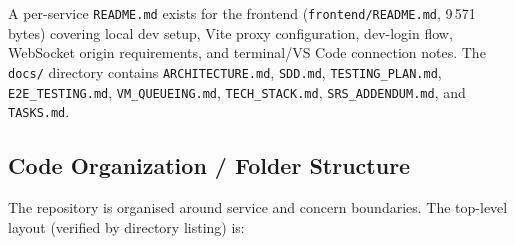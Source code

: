 \documentclass[12pt,a4paper]{article}
\begin{document}
\noindent
A per-service \texttt{README.md} exists for the frontend
(\texttt{frontend/README.md}, 9\,571 bytes) covering local dev setup,
Vite proxy configuration, dev-login flow, WebSocket origin requirements,
and terminal/VS Code connection notes.
The \texttt{docs/} directory contains
\texttt{ARCHITECTURE.md}, \texttt{SDD.md}, \texttt{TESTING\_PLAN.md},
\texttt{E2E\_TESTING.md}, \texttt{VM\_QUEUEING.md}, \texttt{TECH\_STACK.md},
\texttt{SRS\_ADDENDUM.md}, and \texttt{TASKS.md}.

\subsection{Code Organization / Folder Structure}

The repository is organised around service and concern boundaries. The
top-level layout (verified by directory listing) is:
\end{document}
